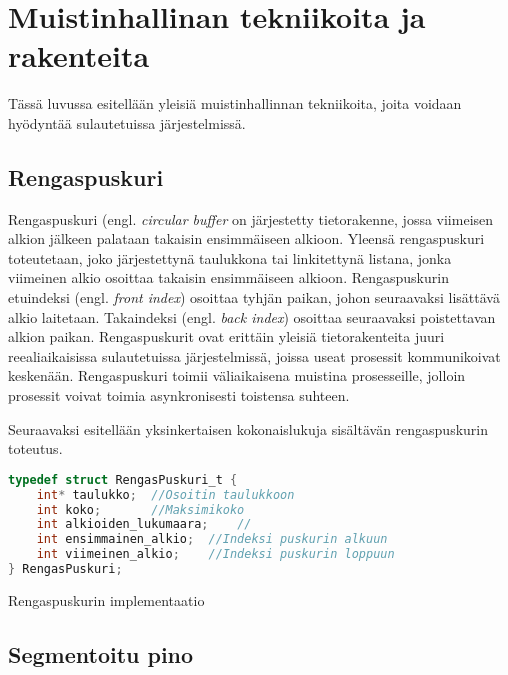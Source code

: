 \chapter{Muistinhallinan tekniikoita ja rakenteita} \label{Neljäs luku}

Tässä luvussa esitellään yleisiä muistinhallinnan tekniikoita, joita voidaan hyödyntää sulautetuissa järjestelmissä.

\section{Rengaspuskuri}

Rengaspuskuri (engl. \textit{circular buffer} on järjestetty tietorakenne, jossa viimeisen alkion jälkeen palataan takaisin ensimmäiseen alkioon. Yleensä rengaspuskuri toteutetaan, joko järjestettynä taulukkona tai linkitettynä listana, jonka viimeinen alkio osoittaa takaisin ensimmäiseen alkioon. Rengaspuskurin etuindeksi (engl. \textit{front index}) osoittaa tyhjän paikan, johon seuraavaksi lisättävä alkio laitetaan. Takaindeksi (engl. \textit{back index}) osoittaa seuraavaksi poistettavan alkion paikan. Rengaspuskurit ovat erittäin yleisiä tietorakenteita juuri reealiaikaisissa sulautetuissa järjestelmissä, joissa useat prosessit kommunikoivat keskenään. Rengaspuskuri toimii väliaikaisena muistina prosesseille, jolloin prosessit voivat toimia asynkronisesti toistensa suhteen.\cite{c2015book}

Seuraavaksi esitellään yksinkertaisen kokonaislukuja sisältävän rengaspuskurin toteutus.

\begin{algorithm}[tbh]
\begin{lstlisting}[language=C]
typedef struct RengasPuskuri_t {
    int* taulukko;  //Osoitin taulukkoon
    int koko;       //Maksimikoko
    int alkioiden_lukumaara;    //
    int ensimmainen_alkio;  //Indeksi puskurin alkuun
    int viimeinen_alkio;    //Indeksi puskurin loppuun
} RengasPuskuri;
\end{lstlisting}
\caption{Rengaspuskurin implementaatio\label{alg:Rengaspuskuri}}
\end{algorithm}

\section{Segmentoitu pino}

